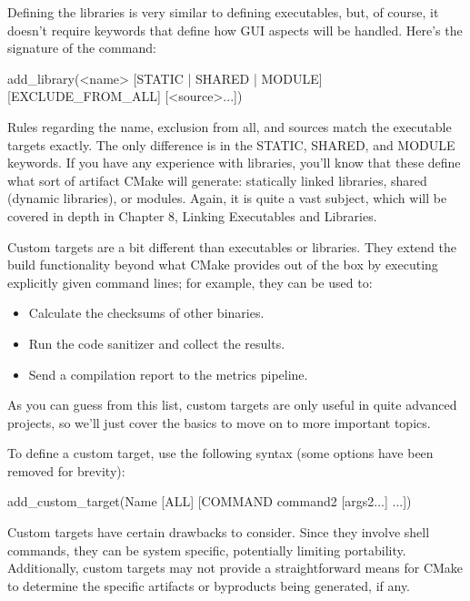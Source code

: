 Defining the libraries is very similar to defining executables, but, of course, it doesn’t require keywords that define how GUI aspects will be handled. Here’s the signature of the command:

\begin{shell}
add_library(<name> [STATIC | SHARED | MODULE]
            [EXCLUDE_FROM_ALL]
            [<source>...])
\end{shell}

Rules regarding the name, exclusion from all, and sources match the executable targets exactly. The only difference is in the STATIC, SHARED, and MODULE keywords. If you have any experience with libraries, you’ll know that these define what sort of artifact CMake will generate: statically linked libraries, shared (dynamic libraries), or modules. Again, it is quite a vast subject, which will be covered in depth in Chapter 8, Linking Executables and Libraries.


Custom targets are a bit different than executables or libraries. They extend the build functionality beyond what CMake provides out of the box by executing explicitly given command lines; for example, they can be used to:

\begin{itemize}
\item
Calculate the checksums of other binaries.

\item
Run the code sanitizer and collect the results.

\item
Send a compilation report to the metrics pipeline.
\end{itemize}

As you can guess from this list, custom targets are only useful in quite advanced projects, so we’ll just cover the basics to move on to more important topics.

To define a custom target, use the following syntax (some options have been removed for brevity):

\begin{shell}
add_custom_target(Name [ALL] [COMMAND command2 [args2...] ...])
\end{shell}

Custom targets have certain drawbacks to consider. Since they involve shell commands, they can be system specific, potentially limiting portability. Additionally, custom targets may not provide a straightforward means for CMake to determine the specific artifacts or byproducts being generated, if any.

